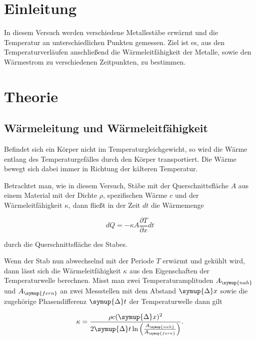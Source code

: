 \section{Einleitung}
\label{sec:Einleitung}

In diesem Versuch werden verschiedene Metallestäbe erwärmt und die Temperatur an unterschiedlichen Punkten gemessen.
Ziel ist es, aus den Temperaturverläufen anschließend die Wärmeleitfähigkeit der Metalle, sowie den Wärmestrom zu verschiedenen Zeitpunkten,
zu bestimmen. 

\section{Theorie}
\label{sec:Theorie}

\subsection{Wärmeleitung und Wärmeleitfähigkeit}
\label{sec:Wärmeleitung und Wärmeleitfähigkeit}

Befindet sich ein Körper nicht im Temperaturgleichgewicht, so wird die Wärme entlang des Temperaturgefälles durch
den Körper transportiert. Die Wärme bewegt sich dabei immer in Richtung der kälteren Temperatur.

Betrachtet man, wie in diesem Versuch, Stäbe mit der Querschnittsfläche $A$ aus einem Material mit der Dichte $\rho$, 
spezifischen Wärme $c$ und der Wärmeleitfähigkeit $\kappa$, dann fließt in der Zeit $dt$ die Wärmemenge

\begin{equation}
    dQ = -\kappa A\frac{\partial T}{\partial x}dt
    \label{eq:Wärmemenge}
\end{equation}

durch die Querschnittsfläche des Stabes. \cite{v204}

Wenn der Stab nun abwechselnd mit der Periode $T$ erwärmt und gekühlt wird, dann lässt sich die Wärmeleitfähigkeit
$\kappa$ aus den Eigenschaften der Temperaturwelle berechnen.
Misst man zwei Temperaturamplituden $A_{\symup{nah}}$ und $A_{\symup{fern}}$ an zwei Messstellen mit dem Abstand $\symup{\Delta} x$
sowie die zugehörige Phasendifferenz $\symup{\Delta} t$ der Temperaturwelle dann gilt

\begin{equation}
    \kappa =\frac{\rho c(\symup{\Delta} x)^{2}}{2\symup{\Delta} t\,\textup{ln}\left(\frac{A_{\symup{nah}}}{A_{\symup{fern}}}\right)}.
    \label{eq:Kappa}
\end{equation}


